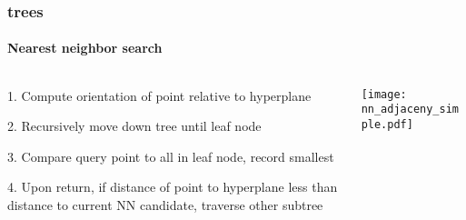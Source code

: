 \begin{frame}
  \frametitle{\kd trees}
  \framesubtitle{Nearest neighbor search}
  \begin{columns}[T]
    \begin{column}{.5\textwidth}
      \begin{block}{}%
        {\color{white} 1.\hspace{1mm} Compute orientation of point relative to hyperplane
          \\\vspace{0.4cm}
        
        2.\hspace{1mm} Recursively move down tree until leaf node\\\vspace{0.4cm}

        3.\hspace{1mm} Compare query point to all in leaf node, record smallest\\\vspace{0.4cm}
    
        4.\hspace{1mm} Upon return, if distance of point to hyperplane less than distance to current
          NN candidate, traverse other subtree}
      \end{block}
    \end{column}
    \begin{column}{.5\textwidth}
      \begin{block}{}
        \texttt{[image: nn\_adjaceny\_simple.pdf]}
      \end{block}
    \end{column}
  \end{columns}
\end{frame}


%
%

